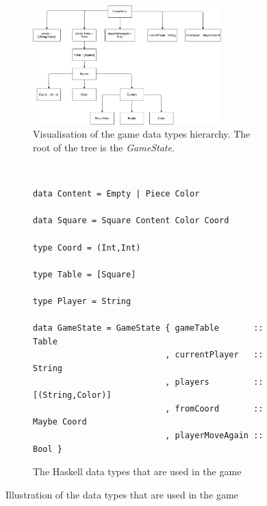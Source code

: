 \documentclass[a4paper]{article}
\begin{document}
\begin{figure}[h!]
    \centering
\begin{subfigure}{\textwidth}
    \centering
    \includegraphics[scale=0.8,width=0.8\textwidth]{figure/gameTypesHierarchy}
    \caption{Visualisation of the game data types hierarchy. The root of the tree is the \textit{GameState}.}
\end{subfigure}
~
\begin{subfigure}{\textwidth}
\begin{lstlisting}
data Content = Empty | Piece Color

data Square = Square Content Color Coord

type Coord = (Int,Int)

type Table = [Square]

type Player = String

data GameState = GameState { gameTable       :: Table
                           , currentPlayer   :: String
                           , players         :: [(String,Color)]
                           , fromCoord       :: Maybe Coord
                           , playerMoveAgain :: Bool }
\end{lstlisting}
    \caption{The Haskell data types that are used in the game}
    \end{subfigure}
    \caption{Illustration of the data types that are used in the game}
    \label{fig:gameTypes}
\end{figure}

\end{document}
